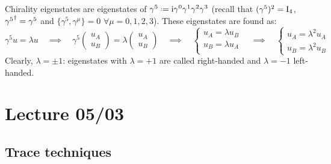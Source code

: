 Chirality eigenstates are eigenstates of $ \gamma^5 \defeq \img \gamma^0 \gamma^1 \gamma^2 \gamma^3 $ (recall that $ (\gamma^5)^2 = \mathrm{I}_4 $, $ {\gamma^5}^\dagger = \gamma^5 $ and $ \{\gamma^5 , \gamma^\mu\} = 0 \,\,\forall \mu = 0,1,2,3 $). These eigenstates are found as:
\begin{equation*}
  \gamma^5 u = \lambda u
  \quad \implies \quad
  \gamma^5
  \begin{pmatrix}
    u_A \\ u_B
  \end{pmatrix}
  = \lambda
  \begin{pmatrix}
    u_A \\ u_B
  \end{pmatrix}
  \quad \implies \quad
  \begin{cases}
    u_A = \lambda u_B  \\
    u_B = \lambda u_A  \\
  \end{cases}
  \quad \implies \quad
  \begin{cases}
    u_A = \lambda^2 u_A  \\
    u_B = \lambda^2 u_B
  \end{cases}
\end{equation*}
Clearly, $ \lambda = \pm 1 $: eigenstates with $ \lambda = +1 $ are called right-handed and $ \lambda = -1 $ left-handed.

\chapter{Lecture 05/03}

\section{Trace techniques}

